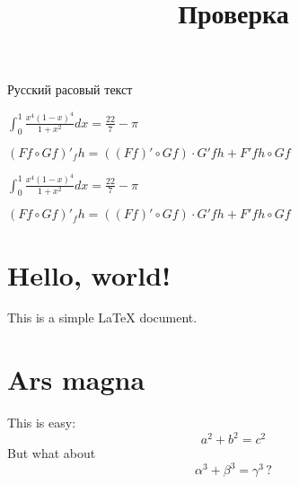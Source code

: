 \documentclass[a4paper]{article}
\renewcommand\maketitle{}
\begin{document}


\title{Проверка}

\maketitle

Русский расовый текст

\httextmode

$\int_{0}^{1}\frac{x^{4}\left(1-x\right)^{4}}{1+x^{2}}dx=
\frac{22}{7}-\pi$

$(Ff \circ Gf)'_f h = ((Ff)' \circ Gf)\cdot G'fh + F'fh \circ Gf$

\htpicmode

$\int_{0}^{1}\frac{x^{4}\left(1-x\right)^{4}}{1+x^{2}}dx=
\frac{22}{7}-\pi$

$(Ff \circ Gf)'_f h = ((Ff)' \circ Gf)\cdot G'fh + F'fh \circ Gf$

\section{Hello, world!}  
This is a simple \LaTeX{} document.  
\section{Ars magna}  
This is easy:  
\[ a^2 + b^2 = c^2 \]  
But what about  
\[ \alpha^3 + \beta^3 = \gamma^3 \, ? \]  
\end{document}

